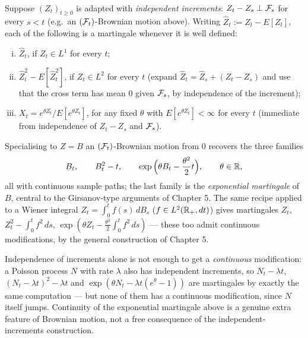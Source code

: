 \begin{example} \label{chap3.3:example-brownian_martingales}  \\
Suppose $(Z_t)_{t\ge0}$ is adapted with \textit{independent increments}: $Z_t-Z_s\perp\mathcal{F}_s$ for every $s<t$ (e.g.\ an $(\mathcal{F}_t)$-Brownian motion above). Writing $\hat Z_t:=Z_t-E[Z_t]$, each of the following is a martingale whenever it is well defined:
\begin{enumerate}[(i)]
    \item $\hat Z_t$, if $Z_t\in L^1$ for every $t$;
    \item $\hat Z_t^2-E[\hat Z_t^2]$, if $Z_t\in L^2$ for every $t$ (expand $\hat Z_t=\hat Z_s+(Z_t-Z_s)$ and use that the cross term has mean $0$ given $\mathcal{F}_s$, by independence of the increment);
    \item $X_t=e^{\theta Z_t}/E[e^{\theta Z_t}]$, for any fixed $\theta$ with $E[e^{\theta Z_t}]<\infty$ for every $t$ (immediate from independence of $Z_t-Z_s$ and $\mathcal{F}_s$).
\end{enumerate}
Specialising to $Z=B$ an $(\mathcal{F}_t)$-Brownian motion from $0$ recovers the three families
$$B_t, \qquad B_t^2-t, \qquad \exp\Big(\theta B_t-\frac{\theta^2}{2}t\Big),\qquad \theta\in\mathbb{R},$$
all with continuous sample paths; the last family is the \textit{exponential martingale} of $B$, central to the Girsanov-type arguments of Chapter 5. The same recipe applied to a Wiener integral $Z_t=\int_0^tf(s)\,dB_s$ ($f\in L^2(\mathbb{R}_+,dt)$) gives martingales $Z_t$, $Z_t^2-\int_0^tf^2\,ds$, $\exp(\theta Z_t-\tfrac{\theta^2}2\int_0^tf^2\,ds)$ --- these too admit continuous modifications, by the general construction of Chapter 5.
\end{example}
\begin{trap}
Independence of increments alone is not enough to get a \emph{continuous} modification: a Poisson process $N$ with rate $\lambda$ also has independent increments, so $N_t-\lambda t$, $(N_t-\lambda t)^2-\lambda t$ and $\exp(\theta N_t-\lambda t(e^\theta-1))$ are martingales by exactly the same computation --- but none of them has a continuous modification, since $N$ itself jumps. Continuity of the exponential martingale above is a genuine extra feature of Brownian motion, not a free consequence of the independent-increments construction.
\end{trap}

